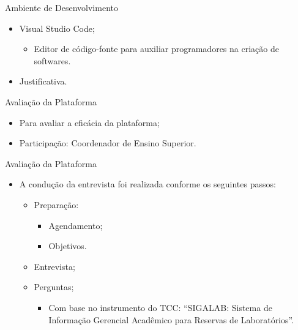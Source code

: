 \begin{frame}{Ambiente de Desenvolvimento}
    \begin{itemize}
        \item Visual Studio Code; \vspace{0.5cm}
        \begin{itemize}
            \item Editor de código-fonte para auxiliar programadores na criação de softwares. \vspace{0.5cm}
        \end{itemize}
        \item Justificativa. \vspace{0.5cm}
    \end{itemize}
\end{frame}

\begin{frame}{Avaliação da Plataforma}
    \begin{itemize}
        \item Para avaliar a eficácia da plataforma; \vspace{0.5cm}
        \item Participação: Coordenador de Ensino Superior. \vspace{0.5cm}
    \end{itemize}
\end{frame}

\begin{frame}{Avaliação da Plataforma}
    \begin{itemize}
        \item A condução da entrevista foi realizada conforme os seguintes passos: \vspace{0.5cm}
              \begin{itemize}
                  \item Preparação: \vspace{0.5cm}
                        \begin{itemize}
                            \item Agendamento; \vspace{0.25cm}
                            \item Objetivos. \vspace{0.5cm}
                        \end{itemize}
                  \item Entrevista; \vspace{0.5cm}
                  \item Perguntas; \vspace{0.25cm}
                  \begin{itemize}
                    \item Com base no instrumento do TCC: ``SIGALAB: Sistema de Informação Gerencial Acadêmico para Reservas de Laboratórios''.
                  \end{itemize}
              \end{itemize}
    \end{itemize}
\end{frame}

